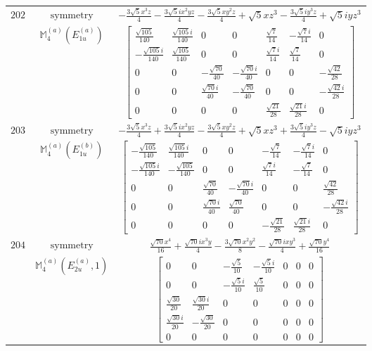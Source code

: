\documentclass[fleqn,8pt,landscape]{jsarticle}
\begin{document}
\begin{longtable}{ccc}
$ 202 $ & $ \text{symmetry} $ & $ - \frac{3 \sqrt{5} x^{3} z}{4} - \frac{3 \sqrt{5} i x^{2} y z}{4} - \frac{3 \sqrt{5} x y^{2} z}{4} + \sqrt{5} x z^{3} - \frac{3 \sqrt{5} i y^{3} z}{4} + \sqrt{5} i y z^{3} $ \\
$  $ & $ \mathbb{M}_{4}^{(a)}(E_{1u}^{(a)}) $ & $ \begin{bmatrix} \frac{\sqrt{105}}{140} & \frac{\sqrt{105} i}{140} & 0 & 0 & \frac{\sqrt{7}}{14} & - \frac{\sqrt{7} i}{14} & 0 \\ - \frac{\sqrt{105} i}{140} & \frac{\sqrt{105}}{140} & 0 & 0 & \frac{\sqrt{7} i}{14} & \frac{\sqrt{7}}{14} & 0 \\ 0 & 0 & - \frac{\sqrt{70}}{40} & - \frac{\sqrt{70} i}{40} & 0 & 0 & - \frac{\sqrt{42}}{28} \\ 0 & 0 & \frac{\sqrt{70} i}{40} & - \frac{\sqrt{70}}{40} & 0 & 0 & - \frac{\sqrt{42} i}{28} \\ 0 & 0 & 0 & 0 & \frac{\sqrt{21}}{28} & \frac{\sqrt{21} i}{28} & 0 \end{bmatrix} $ \\ \hline
$ 203 $ & $ \text{symmetry} $ & $ - \frac{3 \sqrt{5} x^{3} z}{4} + \frac{3 \sqrt{5} i x^{2} y z}{4} - \frac{3 \sqrt{5} x y^{2} z}{4} + \sqrt{5} x z^{3} + \frac{3 \sqrt{5} i y^{3} z}{4} - \sqrt{5} i y z^{3} $ \\
$  $ & $ \mathbb{M}_{4}^{(a)}(E_{1u}^{(b)}) $ & $ \begin{bmatrix} - \frac{\sqrt{105}}{140} & \frac{\sqrt{105} i}{140} & 0 & 0 & - \frac{\sqrt{7}}{14} & - \frac{\sqrt{7} i}{14} & 0 \\ - \frac{\sqrt{105} i}{140} & - \frac{\sqrt{105}}{140} & 0 & 0 & \frac{\sqrt{7} i}{14} & - \frac{\sqrt{7}}{14} & 0 \\ 0 & 0 & \frac{\sqrt{70}}{40} & - \frac{\sqrt{70} i}{40} & 0 & 0 & \frac{\sqrt{42}}{28} \\ 0 & 0 & \frac{\sqrt{70} i}{40} & \frac{\sqrt{70}}{40} & 0 & 0 & - \frac{\sqrt{42} i}{28} \\ 0 & 0 & 0 & 0 & - \frac{\sqrt{21}}{28} & \frac{\sqrt{21} i}{28} & 0 \end{bmatrix} $ \\ \hline
$ 204 $ & $ \text{symmetry} $ & $ \frac{\sqrt{70} x^{4}}{16} + \frac{\sqrt{70} i x^{3} y}{4} - \frac{3 \sqrt{70} x^{2} y^{2}}{8} - \frac{\sqrt{70} i x y^{3}}{4} + \frac{\sqrt{70} y^{4}}{16} $ \\
$  $ & $ \mathbb{M}_{4}^{(a)}(E_{2u}^{(a)},1) $ & $ \begin{bmatrix} 0 & 0 & - \frac{\sqrt{5}}{10} & - \frac{\sqrt{5} i}{10} & 0 & 0 & 0 \\ 0 & 0 & - \frac{\sqrt{5} i}{10} & \frac{\sqrt{5}}{10} & 0 & 0 & 0 \\ \frac{\sqrt{30}}{20} & \frac{\sqrt{30} i}{20} & 0 & 0 & 0 & 0 & 0 \\ \frac{\sqrt{30} i}{20} & - \frac{\sqrt{30}}{20} & 0 & 0 & 0 & 0 & 0 \\ 0 & 0 & 0 & 0 & 0 & 0 & 0 \end{bmatrix} $ \\ \hline

\end{longtable}
\end{document}
